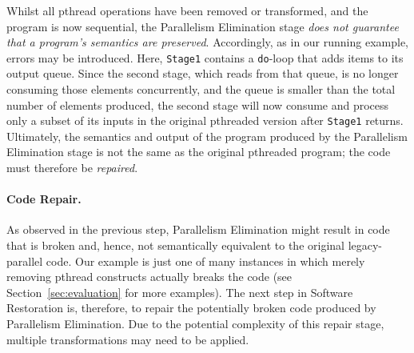 \noindent
Whilst all pthread operations have been removed or transformed, and the program is now sequential, the Parallelism Elimination stage \emph{does not guarantee that a program's semantics are preserved}.
%
Accordingly, as in our running example, errors may be introduced.
%
Here, \lstinline|Stage1| contains a \lstinline|do|-loop that adds items to its output queue. Since the second stage, which reads from that queue, is no longer consuming those elements concurrently, and the queue is smaller than the total number of elements produced, the second stage will now consume and process only a subset of its inputs in the original pthreaded version after \lstinline|Stage1| returns.
%
%
Ultimately, the semantics and output of the program produced by the Parallelism Elimination stage is not the same as the original pthreaded program; the code must therefore be \emph{repaired}.



\paragraph{Code Repair.}
As observed in the previous step, Parallelism Elimination might result in code that is broken and, hence, not semantically equivalent to the original legacy-parallel code.
%
Our example is just one of many instances in which merely removing pthread constructs actually breaks the code (see Section~\ref{sec:evaluation} for more examples). The next step in Software Restoration is, therefore, to repair the potentially broken code produced by Parallelism Elimination. Due to the potential complexity of this repair stage, multiple transformations may need to be applied.
%

